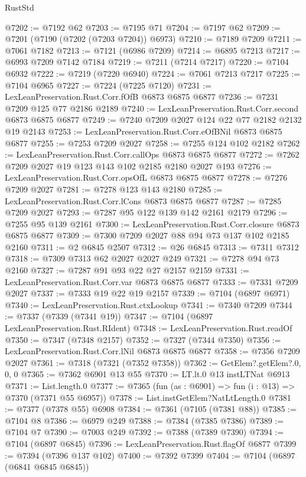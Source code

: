 \begin{lexlean}{RustStd}
\begin{coremodule}
@7202 := @7192 @62
@7203 := @7195 @71
@7204 := @7197 @62
@7209 := @7201 (@7190 (@7202 (@7203 @7204)) @6973)
@7210 := @7189 @7209
@7211 := @7061 @7182
@7213 := @7121 (@6986 @7209)
@7214 := @6895 @7213
@7217 := @6993 @7209 @7142 @7184
@7219 := @7211 (@7214 @7217)
@7220 := @7104 @6932
@7222 := @7219 (@7220 @6940)
@7224 := @7061 @7213 @7217
@7225 := @7104 @6965
@7227 := @7224 (@7225 @7120)
@7231 := LexLeanPreservation.Rust.Corr.fOfB @6873 @6875 @6877
@7236 := @7231 @7209 @125 @77 @2186 @2189
@7240 := LexLeanPreservation.Rust.Corr.second @6873 @6875 @6877
@7249 := @7240 @7209 @2027 @124 @22 @77 @2182 @2132 @19 @2143
@7253 := LexLeanPreservation.Rust.Corr.eOfBNil @6873 @6875 @6877
@7255 := @7253 @7209 @2027
@7258 := @7255 @124 @102 @2182
@7262 := LexLeanPreservation.Rust.Corr.callOps @6873 @6875 @6877
@7272 := @7262 @7209 @2027 @19 @123 @143 @102 @2185 @2180 @2027 @193
@7276 := LexLeanPreservation.Rust.Corr.opsOfL @6873 @6875 @6877
@7278 := @7276 @7209 @2027
@7281 := @7278 @123 @143 @2180
@7285 := LexLeanPreservation.Rust.Corr.lCons @6873 @6875 @6877
@7287 := @7285 @7209 @2027
@7293 := @7287 @95 @122 @139 @142 @2161 @2179
@7296 := @7255 @95 @139 @2161
@7300 := LexLeanPreservation.Rust.Corr.closure @6873 @6875 @6877
@7309 := @7300 @7209 @2027 @88 @94 @73 @137 @102 @2185 @2160
@7311 := @2 @6845 @2507
@7312 := @26 @6845
@7313 := @7311 @7312
@7318 := @7309 @7313 @62 @2027 @2027 @249
@7321 := @7278 @94 @73 @2160
@7327 := @7287 @91 @93 @22 @27 @2157 @2159
@7331 := LexLeanPreservation.Rust.Corr.var @6873 @6875 @6877
@7333 := @7331 @7209 @2027
@7337 := @7333 @19 @22 @19 @2157
@7339 := @7104 (@6897 @6971)
@7340 := LexLeanPreservation.Rust.ctxLookup
@7341 := @7340 @7209
@7344 := @7337 (@7339 (@7341 @19))
@7347 := @7104 (@6897 LexLeanPreservation.Rust.RIdent)
@7348 := LexLeanPreservation.Rust.readOf
@7350 := @7347 (@7348 @2157)
@7352 := @7327 (@7344 @7350)
@7356 := LexLeanPreservation.Rust.Corr.lNil @6873 @6875 @6877
@7358 := @7356 @7209 @2027
@7361 := @7318 (@7321 (@7352 @7358))
@7362 := GetElem?.getElem?.{0, 0, 0}
@7365 := @7362 @6901 @13 @55
@7370 := LT.lt.{0} @13 instLTNat @6913
@7371 := List.length.{0}
@7377 := @7365 (fun (as : @6901) => fun (i : @13) => @7370 (@7371 @55 @6957))
@7378 := List.instGetElem?NatLtLength.{0}
@7381 := @7377 (@7378 @55) @6908
@7384 := @7361 (@7105 (@7381 @88))
@7385 := @7104 @8
@7386 := @6979 @249
@7388 := @7384 (@7385 @7386)
@7389 := @7104 @7
@7390 := @7003 @249
@7392 := @7388 (@7389 @7390)
@7394 := @7104 (@6897 @6845)
@7396 := LexLeanPreservation.Rust.flagOf @6877
@7399 := @7394 (@7396 @137 @102)
@7400 := @7392 @7399
@7404 := @7104 (@6897 (@6841 @6845 @6845))

\end{coremodule}
\end{lexlean}
